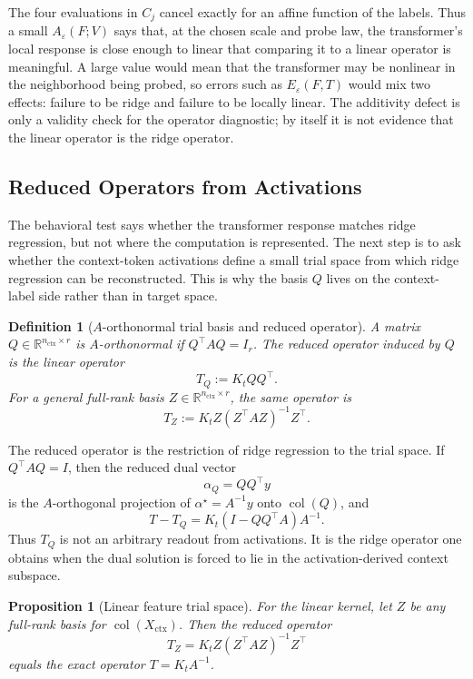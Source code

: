 \documentclass[11pt]{article}
\newtheorem{definition}{Definition}
\newtheorem{proposition}{Proposition}
\newcommand{\R}{\mathbb{R}}
\begin{document}
The four evaluations in \(C_j\) cancel exactly for an affine function of the labels. Thus a small
\(A_\varepsilon(F;V)\) says that, at the chosen scale and probe law, the transformer's local response
is close enough to linear that comparing it to a linear operator is meaningful. A large value would
mean that the transformer may be nonlinear in the neighborhood being probed, so errors such as
\(E_\varepsilon(F,T)\) would mix two effects: failure to be ridge and failure to be locally linear. The
additivity defect is only a validity check for the operator diagnostic; by itself it is not evidence
that the linear operator is the ridge operator.

\subsection{Reduced Operators from Activations}

The behavioral test says whether the transformer response matches ridge regression, but not where
the computation is represented. The next step is to ask whether the context-token activations
define a small trial space from which ridge regression can be reconstructed. This is why the basis
\(Q\) lives on the context-label side rather than in target space.

\begin{definition}[\(A\)-orthonormal trial basis and reduced operator]
A matrix \(Q\in\R^{n_{\mathrm{ctx}}\times r}\) is \(A\)-orthonormal if \(Q^\top AQ=I_r\). The reduced
operator induced by \(Q\) is the linear operator
\[
T_Q:=K_tQQ^\top.
\]
For a general full-rank basis \(Z\in\R^{n_{\mathrm{ctx}}\times r}\), the same operator is
\[
T_Z:=K_tZ(Z^\top AZ)^{-1}Z^\top.
\]
\end{definition}

The reduced operator is the restriction of ridge regression to the trial space. If \(Q^\top AQ=I\),
then the reduced dual vector
\[
\alpha_Q=QQ^\top y
\]
is the \(A\)-orthogonal projection of \(\alpha^\star=A^{-1}y\) onto \(\operatorname{col}(Q)\), and
\[
T-T_Q=K_t(I-QQ^\top A)A^{-1}.
\]
Thus \(T_Q\) is not an arbitrary readout from activations. It is the ridge operator one obtains when
the dual solution is forced to lie in the activation-derived context subspace.

\begin{proposition}[Linear feature trial space]
For the linear kernel, let \(Z\) be any full-rank basis for \(\operatorname{col}(X_{\mathrm{ctx}})\). Then
the reduced operator
\[
T_Z=K_tZ(Z^\top AZ)^{-1}Z^\top
\]
equals the exact operator \(T=K_tA^{-1}\).
\end{proposition}
\end{document}
